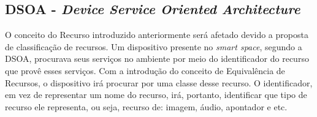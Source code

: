 \subsection{DSOA - \emph{Device Service Oriented Architecture}}

O conceito do Recurso introduzido anteriormente será afetado devido a proposta de classificação de recursos. Um dispositivo presente no \emph{smart space}, segundo a DSOA, procurava seus serviços no ambiente por meio do identificador do recurso que provê esses serviços. Com a introdução do conceito de Equivalência de Recursos, o dispositivo irá procurar por uma classe desse recurso. O identificador, em vez de representar um nome do recurso, irá, portanto, identificar que tipo de recurso ele representa, ou seja, recurso de: imagem, áudio, apontador e etc.